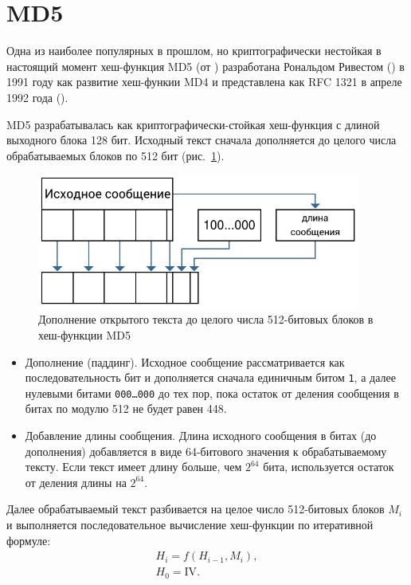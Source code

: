 \section{MD5}

Одна из наиболее популярных в прошлом, но криптографически нестойкая в настоящий момент хеш-функция MD5 (от ) разработана Рональдом Ривестом () в 1991 году как развитие хеш-функии MD4 и представлена как RFC 1321 в апреле 1992 года (\cite{rfc1321}).

MD5 разрабатывалась как криптографически-стойкая хеш-функция с длиной выходного блока 128 бит. Исходный текст сначала дополняется до целого числа обрабатываемых блоков по 512 бит (рис.~\ref{fig:md5-padding}).

\begin{figure}[htb]
    \centering
    \includegraphics[width=0.95\textwidth]{pic/md5-padding}
    \caption{Дополнение открытого текста до целого числа 512-битовых блоков в хеш-функции MD5}
    \label{fig:md5-padding}
\end{figure}

\begin{itemize}
  \item Дополнение (паддинг). Исходное сообщение рассматривается как последовательность бит и дополняется сначала единичным битом \texttt{1}, а далее нулевыми битами \texttt{{000}\dots{000}} до тех пор, пока остаток от деления сообщения в битах по модулю 512 не будет равен 448.
  \item Добавление длины сообщения. Длина исходного сообщения в битах (до дополнения) добавляется в виде 64-битового значения к обрабатываемому тексту. Если текст имеет длину больше, чем $2^{64}$ бита, используется остаток от деления длины на $2^{64}$.
\end{itemize}

Далее обрабатываемый текст разбивается на целое число 512-битовых блоков $M_i$ и выполняется последовательное вычисление хеш-функции по итеративной формуле:
\[\begin{array}{l}
H_i = f ( H_{i-1}, M_i ),\\
H_0 = \text{IV}.\\
\end{array}\]

